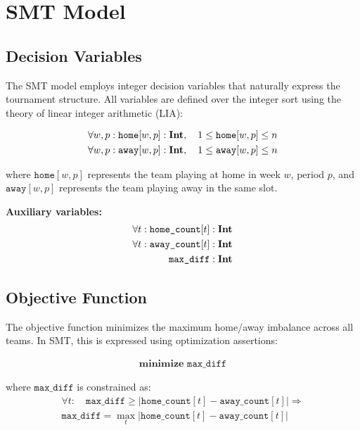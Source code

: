 \documentclass[11pt]{article}
\begin{document}
\section{SMT Model}

\subsection{Decision Variables}

The SMT model employs integer decision variables that naturally express the tournament structure. All variables are defined over the integer sort using the theory of linear integer arithmetic (LIA):

\begin{align}
    \forall w, p:\space\texttt{home}[w,p] &: \textbf{Int}, \quad 1 \leq \texttt{home}[w,p] \leq n \\
    \forall w, p:\space\texttt{away}[w,p] &: \textbf{Int}, \quad 1 \leq \texttt{away}[w,p] \leq n
\end{align}

where $\texttt{home}[w,p]$ represents the team playing at home in week $w$, period $p$, and $\texttt{away}[w,p]$ represents the team playing away in the same slot.

\textbf{Auxiliary variables:}
\begin{align}
\forall t:\space\texttt{home\_count}[t] &: \textbf{Int}  \\
\forall t:\space\texttt{away\_count}[t] &: \textbf{Int}  \\
\texttt{max\_diff} &: \textbf{Int}
\end{align}

\subsection{Objective Function}

The objective function minimizes the maximum home/away imbalance across all teams. In SMT, this is expressed using optimization assertions:

\begin{align}
\textbf{minimize } \texttt{max\_diff}
\end{align}

where $\texttt{max\_diff}$ is constrained as:
\begin{align}
\forall t: \quad \texttt{max\_diff} \geq |\texttt{home\_count}[t] - \texttt{away\_count}[t]| \Rightarrow \\
\texttt{max\_diff} = \max_{t} |\texttt{home\_count}[t] - \texttt{away\_count}[t]|
\end{align}
\end{document}
